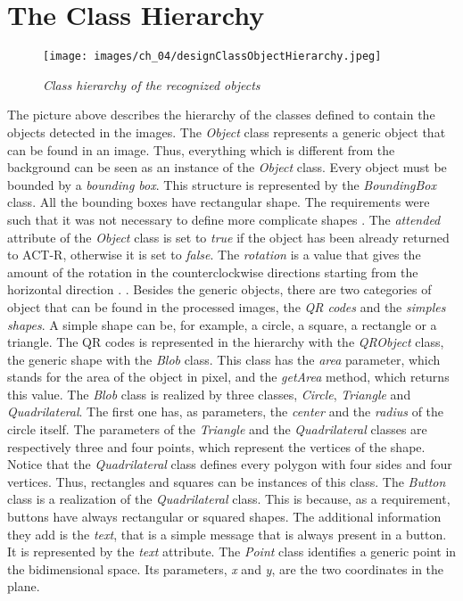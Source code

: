   \section{The Class Hierarchy}
  \begin{figure}[h]
	  \begin{center} 
	    \texttt{[image: images/ch\_04/designClassObjectHierarchy.jpeg]}
	  \end{center} 
	  \caption{\textit{Class hierarchy of the recognized objects}}  
	  \label{fig:modulesActr}
  \end{figure}
   {\newpage}
   {\newpage}
   {\newpage}
   {\newpage}
  The picture above describes the hierarchy of the classes defined to contain the objects detected in the images. The \textit{Object} class represents a generic object that can be found in an image. Thus, everything which is different from the background can be seen as an instance of the \textit{Object} class. Every object must be bounded by a \textit{bounding box}. This structure is represented by the \textit{BoundingBox} class. All the bounding boxes have rectangular shape. The requirements were such that it was not necessary to define more complicate shapes . The \textit{attended} attribute of the \textit{Object}  class is set to \textit{true} if the object has been already returned to ACT-R, otherwise it is set to \textit{false}. The \textit{rotation} is a value that gives the amount of the rotation in the counterclockwise directions starting from the horizontal direction . .
  Besides the generic objects, there are two categories of object that can be found in the processed images, the \textit{QR codes} and the \textit{simples shapes}. A simple shape can be, for example, a circle, a square, a rectangle or a triangle. The QR codes is represented in the hierarchy with the \textit{QRObject} class, the generic shape with the \textit{Blob} class.
  This class has the \textit{area} parameter, which stands for the area of the object in pixel, and the  \textit{getArea} method, which returns this value. The \textit{Blob} class is realized by three classes, \textit{Circle}, \textit{Triangle} and \textit{Quadrilateral}. 
  The first one has, as parameters, the \textit{center} and the \textit{radius} of the circle itself.
  The parameters of the \textit{Triangle} and the \textit{Quadrilateral} classes are respectively three and four points, which represent the vertices of the shape. Notice that the \textit{Quadrilateral} class defines every polygon with four sides and four vertices. Thus, rectangles and squares can be instances of this class. 
  The \textit{Button} class is a realization of the \textit{Quadrilateral} class. This is because, as a requirement, buttons have always rectangular or squared shapes. The additional information they add is the \textit{text}, that is a simple message that is always present in a button. It is represented by the \textit{text} attribute. 
  The \textit{Point} class identifies a generic point in the bidimensional space. Its parameters, \textit{x} and \textit{y}, are the two coordinates in the plane.
 

  
  
  
  
  